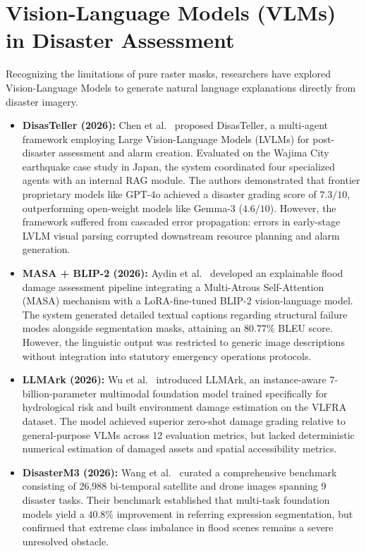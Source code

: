 \section{Vision-Language Models (VLMs) in Disaster Assessment}
Recognizing the limitations of pure raster masks, researchers have explored Vision-Language Models to generate natural language explanations directly from disaster imagery.
\begin{itemize}
    \item \textbf{DisasTeller (2026):} Chen et al.~\cite{disasteller2026} proposed DisasTeller, a multi-agent framework employing Large Vision-Language Models (LVLMs) for post-disaster assessment and alarm creation. Evaluated on the Wajima City earthquake case study in Japan, the system coordinated four specialized agents with an internal RAG module. The authors demonstrated that frontier proprietary models like GPT-4o achieved a disaster grading score of $7.3/10$, outperforming open-weight models like Gemma-3 ($4.6/10$). However, the framework suffered from cascaded error propagation: errors in early-stage LVLM visual parsing corrupted downstream resource planning and alarm generation.
    \item \textbf{MASA + BLIP-2 (2026):} Aydin et al.~\cite{masa_blip2026} developed an explainable flood damage assessment pipeline integrating a Multi-Atrous Self-Attention (MASA) mechanism with a LoRA-fine-tuned BLIP-2 vision-language model. The system generated detailed textual captions regarding structural failure modes alongside segmentation masks, attaining an $80.77\%$ BLEU score. However, the linguistic output was restricted to generic image descriptions without integration into statutory emergency operations protocols.
    \item \textbf{LLMArk (2026):} Wu et al.~\cite{llmark2025} introduced LLMArk, an instance-aware 7-billion-parameter multimodal foundation model trained specifically for hydrological risk and built environment damage estimation on the VLFRA dataset. The model achieved superior zero-shot damage grading relative to general-purpose VLMs across 12 evaluation metrics, but lacked deterministic numerical estimation of damaged assets and spatial accessibility metrics.
    \item \textbf{DisasterM3 (2026):} Wang et al.~\cite{disasterm3_2025} curated a comprehensive benchmark consisting of 26,988 bi-temporal satellite and drone images spanning 9 disaster tasks. Their benchmark established that multi-task foundation models yield a $40.8\%$ improvement in referring expression segmentation, but confirmed that extreme class imbalance in flood scenes remains a severe unresolved obstacle.
\end{itemize}

